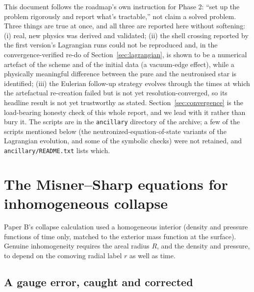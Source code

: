 \documentclass[11pt]{article}
\begin{document}
This document follows the roadmap's own instruction for Phase 2: ``set up the problem rigorously and report what's tractable,'' not claim a solved problem. Three things are true at once, and all three are reported here without softening: (i) real, new physics was derived and validated; (ii) the shell crossing reported by the first version's Lagrangian runs could not be reproduced and, in the convergence-verified re-do of Section~\ref{sec:lagrangian}, is shown to be a numerical artefact of the scheme and of the initial data (a vacuum-edge effect), while a physically meaningful difference between the pure and the neutronised star is identified; (iii) the Eulerian follow-up strategy evolves through the times at which the artefactual re-creation failed but is not yet resolution-converged, so its headline result is not yet trustworthy as stated. Section~\ref{sec:convergence} is the load-bearing honesty check of this whole report, and we lead with it rather than bury it. The scripts are in the \texttt{ancillary} directory of the archive; a few of the scripts mentioned below (the neutronized-equation-of-state variants of the Lagrangian evolution, and some of the symbolic checks) were not retained, and \texttt{ancillary/README.txt} lists which.

\section{The Misner--Sharp equations for inhomogeneous collapse}
\label{sec:ms}

Paper B's collapse calculation used a homogeneous interior (density and pressure functions of time only, matched to the exterior mass function at the surface). Genuine inhomogeneity requires the areal radius $R$, and the density and pressure, to depend on the comoving radial label $r$ as well as time.

\subsection{A gauge error, caught and corrected}
\label{sec:gauge-error}
\end{document}
